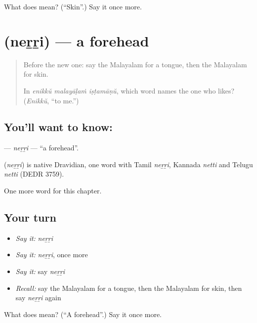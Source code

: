 \begin{tcolorbox}[breakable,colback=teal!4,colframe=teal!35!black,title={Before you move on}]
What does  mean? (\textquotedblleft{}Skin\textquotedblright{}.) Say it once more.
\end{tcolorbox}
\section[\texorpdfstring{\ml{നെറ്റി} (neṟṟi)}{നെറ്റി (neṟṟi)}]{ (neṟṟi) — a forehead}

\label{lesson:ML-C154-nerri}



\begin{quote}
Before the new one: say the Malayalam for a tongue, then the Malayalam for skin.

In \emph{enikkŭ malayāḷaṁ iṣṭamāṇŭ}, which word names the one who likes? (\emph{Enikkŭ}, \textquotedblleft{}to me.\textquotedblright{})
\end{quote}

\subsection*{You'll want to know: }
\textbf{} — \emph{neṟṟi} — \textquotedblleft{}a forehead\textquotedblright{}.

\begin{cousinweb}
\textbf{} (\emph{neṟṟi}) is native Dravidian, one word with Tamil \emph{neṟṟi}, Kannada \emph{netti} and Telugu \emph{netti} (DEDR 3759).
\end{cousinweb}

\begin{grammarlens}[title={What you've built}]
One more word for this chapter.
\end{grammarlens}

\subsection*{Your turn}
\begin{itemize}
\raggedright
  \item \emph{Say it:} \emph{neṟṟi}
  \item \emph{Say it:} \emph{neṟṟi}, once more
  \item \emph{Say it:} say \emph{neṟṟi}
  \item \emph{Recall:} say the Malayalam for a tongue, then the Malayalam for skin, then say \emph{neṟṟi} again
\end{itemize}

\begin{tcolorbox}[breakable,colback=teal!4,colframe=teal!35!black,title={Before you move on}]
What does  mean? (\textquotedblleft{}A forehead\textquotedblright{}.) Say it once more.
\end{tcolorbox}
